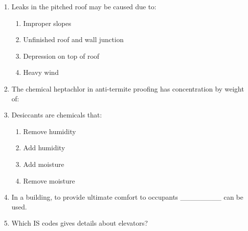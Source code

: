 \documentclass[11pt,a4paper]{article}
\begin{document}
\begin{enumerate}
\\
\item{Leaks in the pitched roof may be caused due to:}
\begin{enumerate}[label=\Alph*.]
\item{Improper slopes}
\item{Unfinished roof and wall junction}
\item{Depression on top of roof}
\item{Heavy wind}
\end{enumerate}
\item{The chemical heptachlor in anti-termite proofing has concentration by weight of:}
\\
\item{Desiccants are chemicals that:}
\begin{enumerate}[label=\Alph*.]
\item{Remove humidity}
\item{Add humidity}
\item{Add moisture}
\item{Remove moisture}
\end{enumerate}
\item{In a building, to provide ultimate comfort to occupants \_\_\_\_\_\_\_\_ can be used.}
\\
\item{Which IS codes gives details about elevators?}
\\\begin{enumerate*}[itemjoin=\qquad, label=\Alph*.]

\end{enumerate*}
\end{enumerate}
\end{document}
